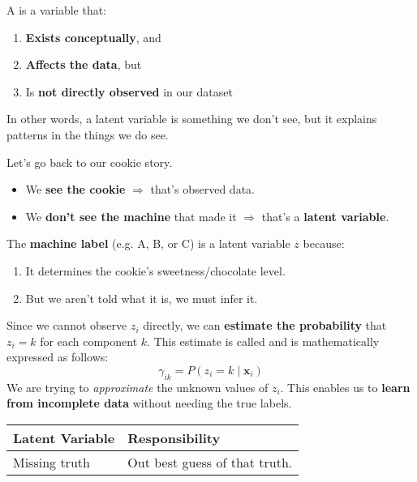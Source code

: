 \highspace
A  is a variable that:
\begin{enumerate}
    \item \textbf{Exists conceptually}, and
    \item \textbf{Affects the data}, but
    \item Is \textbf{not directly observed} in our dataset
\end{enumerate}
In other words, a latent variable is something we don't see, but it explains patterns in the things we do see.

\begin{examplebox}
    Let's go back to our cookie story.
    \begin{itemize}
        \item We \textbf{see the cookie} $\Rightarrow$ that's observed data.
        \item We \textbf{don't see the machine} that made it $\Rightarrow$ that's a \textbf{latent variable}.
    \end{itemize}
    The \textbf{machine label} (e.g. A, B, or C) is a latent variable $z$ because:
    \begin{enumerate}
        \item It determines the cookie's sweetness/chocolate level.
        \item But we aren't told what it is, we must infer it.
    \end{enumerate}
\end{examplebox}

\noindent
Since we cannot observe $z_{i}$ directly, we can \textbf{estimate the probability} that $z_{i} = k$ for each component $k$. This estimate is called  and is mathematically expressed as follows:
\begin{equation}
    \gamma_{ik} = P\left(z_{i} = k \mid \mathbf{x}_i\right)
\end{equation}
We are trying to \emph{approximate} the unknown values of $z_{i}$. This enables us to \textbf{learn from incomplete data} without needing the true labels.

\begin{table}[!htp]
    \centering
    \begin{tabular}{@{} l | l @{}}
        \toprule
        \textbf{Latent Variable}    & \textbf{Responsibility} \\
        \midrule
        Missing truth               & Out best guess of that truth. \\
        \bottomrule
    \end{tabular}
\end{table}

